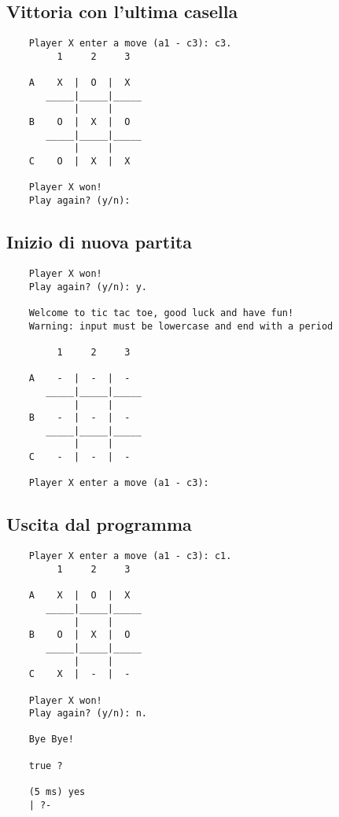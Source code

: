 \documentclass{article}
\begin{document}
\subsection{Vittoria con l'ultima casella}
    \begin{verbatim}
    Player X enter a move (a1 - c3): c3.
         1     2     3

    A    X  |  O  |  X  
       _____|_____|_____
            |     |     
    B    O  |  X  |  O  
       _____|_____|_____
            |     |     
    C    O  |  X  |  X  

    Player X won!
    Play again? (y/n): 
    \end{verbatim}

\subsection{Inizio di nuova partita}
    \begin{verbatim}
    Player X won!
    Play again? (y/n): y.

    Welcome to tic tac toe, good luck and have fun!
    Warning: input must be lowercase and end with a period

         1     2     3

    A    -  |  -  |  -  
       _____|_____|_____
            |     |     
    B    -  |  -  |  -  
       _____|_____|_____
            |     |     
    C    -  |  -  |  -  

    Player X enter a move (a1 - c3):
    \end{verbatim}

\subsection{Uscita dal programma}
    \begin{verbatim}
    Player X enter a move (a1 - c3): c1.
         1     2     3

    A    X  |  O  |  X  
       _____|_____|_____
            |     |     
    B    O  |  X  |  O  
       _____|_____|_____
            |     |     
    C    X  |  -  |  -  

    Player X won!
    Play again? (y/n): n.

    Bye Bye!

    true ? 

    (5 ms) yes
    | ?- 
    \end{verbatim}
\end{document}
